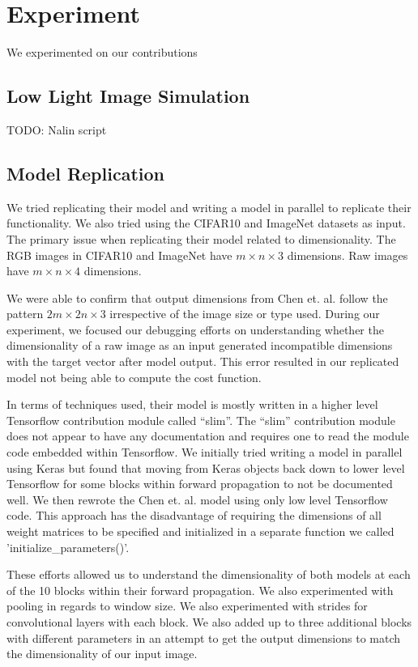 \documentclass{article}
\begin{document}
\section{Experiment}

We experimented on our contributions

\subsection{Low Light Image Simulation}

TODO: Nalin script

\subsection{Model Replication}

We tried replicating their model and writing a model in parallel to
replicate their functionality. We also tried using the CIFAR10 and
ImageNet datasets as input. The primary issue when replicating their
model related to dimensionality. The RGB images in CIFAR10 and ImageNet
have $m \times n \times 3$ dimensions. Raw images have $m \times n \times 4$
dimensions.

We were able to confirm that output dimensions from Chen et. al.
\cite{chen2018learning} follow the pattern $2m \times 2n \times 3$
irrespective of the image size or type used. During our experiment,
we focused our debugging efforts on understanding whether the dimensionality
of a raw image as an input generated incompatible dimensions with the
target vector after model output. This error resulted in our replicated
model not being able to compute the cost function.

In terms of techniques used, their model is mostly written in a higher
level Tensorflow contribution module called ``slim''. The ``slim''
contribution module does not appear to have any documentation and requires
one to read the module code embedded within Tensorflow. We initially tried
writing a model in parallel using Keras but found that moving from Keras
objects back down to lower level Tensorflow for some blocks within
forward propagation to not be documented well. We then rewrote the
Chen et. al. \cite{chen2018learning} model using only low level Tensorflow
code. This approach has the disadvantage of requiring the dimensions of
all weight matrices to be specified and initialized in a separate function
we called 'initialize\_parameters()'.

These efforts allowed us to understand the dimensionality of both models
at each of the 10 blocks within their forward propagation. We also
experimented with pooling in regards to window size. We also experimented
with strides for convolutional layers with each block. We also added up
to three additional blocks with different parameters in an attempt to
get the output dimensions to match the dimensionality of our input image.
\end{document}
